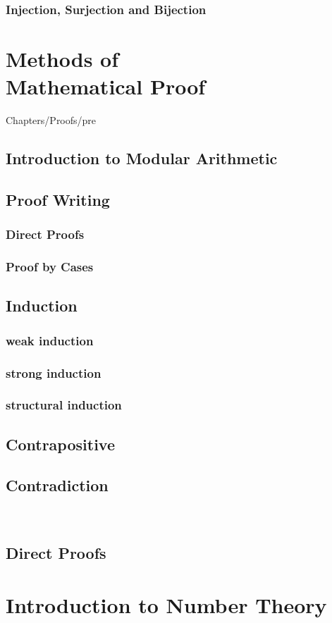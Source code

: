 \documentclass[12pt,a4paper]{book}
\begin{document}
\subsection{Injection, Surjection and Bijection}



\chapter{Methods of\\ Mathematical Proof}

 {Chapters/Proofs/pre}

\section{Introduction to Modular Arithmetic}

\section{Proof Writing}
\subsection{Direct Proofs}
\subsection{Proof by Cases}
\section{Induction}
\subsection{weak induction}
\subsection{strong induction}
\subsection{structural induction}

\section{Contrapositive}

\section{Contradiction}



\


\newpage\thispagestyle{empty}\blankpage
\section{Direct Proofs}

\chapter{Introduction to Number Theory}



\blankpage


\nocite{*}
\end{document}
